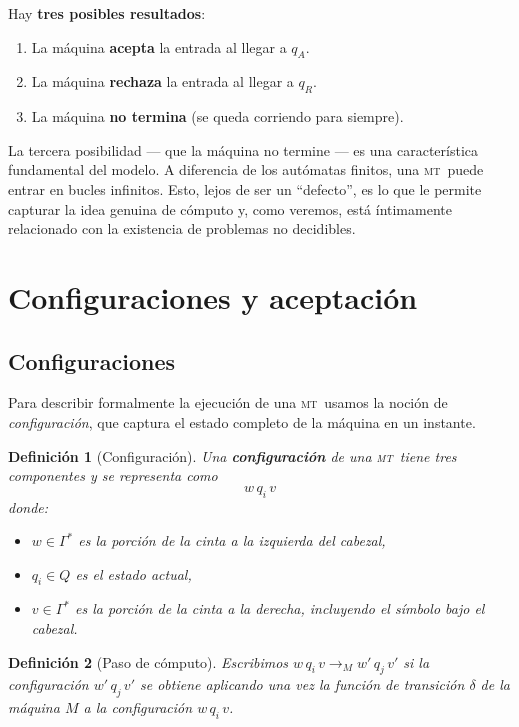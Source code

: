 \documentclass[11pt,a4paper]{article}
\theoremstyle{definicion}
\newtheorem{definicion}{Definición}[section]
\newcommand{\MT}{\textsc{mt}}
\begin{document}
Hay \textbf{tres posibles resultados}:
\begin{enumerate}[label=(\roman*)]
    \item La máquina \textbf{acepta} la entrada al llegar a $q_A$.
    \item La máquina \textbf{rechaza} la entrada al llegar a $q_R$.
    \item La máquina \textbf{no termina} (se queda corriendo para siempre).
\end{enumerate}

\begin{intuicion}
La tercera posibilidad --- que la máquina no termine --- es una característica fundamental del modelo. A diferencia de los autómatas finitos, una \MT\ puede entrar en bucles infinitos. Esto, lejos de ser un ``defecto'', es lo que le permite capturar la idea genuina de cómputo y, como veremos, está íntimamente relacionado con la existencia de problemas no decidibles.
\end{intuicion}

\section{Configuraciones y aceptación}

\subsection{Configuraciones}

Para describir formalmente la ejecución de una \MT\ usamos la noción de \emph{configuración}, que captura el estado completo de la máquina en un instante.

\begin{definicion}[Configuración]
Una \textbf{configuración} de una \MT\ tiene tres componentes y se representa como
\[
w\, q_i\, v
\]
donde:
\begin{itemize}
    \item $w \in \Gamma^*$ es la porción de la cinta a la izquierda del cabezal,
    \item $q_i \in Q$ es el estado actual,
    \item $v \in \Gamma^*$ es la porción de la cinta a la derecha, \emph{incluyendo} el símbolo bajo el cabezal.
\end{itemize}
\end{definicion}

\begin{definicion}[Paso de cómputo]
Escribimos $w\, q_i\, v \to_M w'\, q_j\, v'$ si la configuración $w'\, q_j\, v'$ se obtiene aplicando una vez la función de transición $\delta$ de la máquina $M$ a la configuración $w\, q_i\, v$.
\end{definicion}
\end{document}
